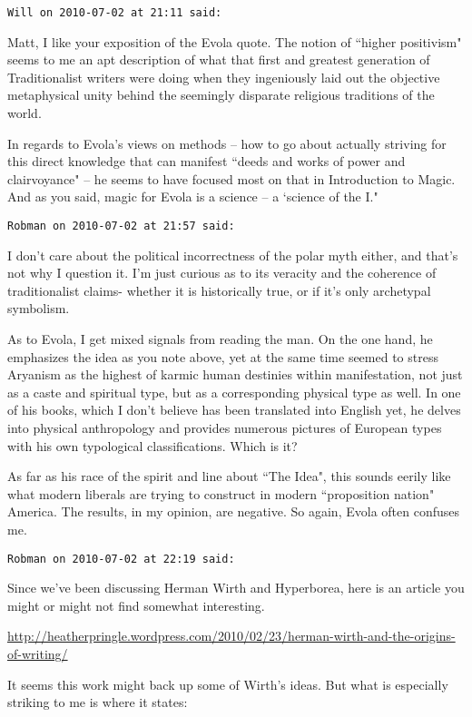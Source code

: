 \begin{footnotesize}
\begin{sffamily}
\texttt{Will on 2010-07-02 at 21:11 said: }

Matt, I like your exposition of the Evola quote. The notion of ``higher positivism" seems to me an apt description of what that first and greatest generation of Traditionalist writers were doing when they ingeniously laid out the objective metaphysical unity behind the seemingly disparate religious traditions of the world.

In regards to Evola's views on methods – how to go about actually striving for this direct knowledge that can manifest ``deeds and works of power and clairvoyance" – he seems to have focused most on that in Introduction to Magic. And as you said, magic for Evola is a science – a `science of the I."


\hfill

\texttt{Robman on 2010-07-02 at 21:57 said: }

I don't care about the political incorrectness of the polar myth either, and that's not why I question it. I'm just curious as to its veracity and the coherence of traditionalist claims- whether it is historically true, or if it's only archetypal symbolism.

As to Evola, I get mixed signals from reading the man. On the one hand, he emphasizes the idea as you note above, yet at the same time seemed to stress Aryanism as the highest of karmic human destinies within manifestation, not just as a caste and spiritual type, but as a corresponding physical type as well. In one of his books, which I don't believe has been translated into English yet, he delves into physical anthropology and provides numerous pictures of European types with his own typological classifications. Which is it?

As far as his race of the spirit and line about ``The Idea", this sounds eerily like what modern liberals are trying to construct in modern ``proposition nation" America. The results, in my opinion, are negative. So again, Evola often confuses me.


\hfill

\texttt{Robman on 2010-07-02 at 22:19 said: }

Since we've been discussing Herman Wirth and Hyperborea, here is an article you might or might not find somewhat interesting. 

\url{http://heatherpringle.wordpress.com/2010/02/23/herman-wirth-and-the-origins-of-writing/}

It seems this work might back up some of Wirth's ideas. But what is especially striking to me is where it states:


\end{sffamily}
\end{footnotesize}
